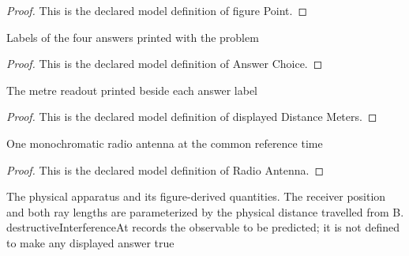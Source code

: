 \begin{proof}
  This is the declared model definition of figure Point.
\end{proof}
\begin{definition}
  \label{def:physics:phyx-mini-0117:phyxminiproblems-problemphyxmini0117-answerchoice}
  Labels of the four answers printed with the problem
\end{definition}
\begin{proof}
  This is the declared model definition of Answer Choice.
\end{proof}
\begin{definition}
  \label{def:physics:phyx-mini-0117:phyxminiproblems-problemphyxmini0117-displayeddistancemeters}
  The metre readout printed beside each answer label
\end{definition}
\begin{proof}
  This is the declared model definition of displayed Distance Meters.
\end{proof}
\begin{definition}
  \label{def:physics:phyx-mini-0117:phyxminiproblems-problemphyxmini0117-radioantenna}
  One monochromatic radio antenna at the common reference time
\end{definition}
\begin{proof}
  This is the declared model definition of Radio Antenna.
\end{proof}
\begin{definition}
  \label{def:physics:phyx-mini-0117:phyxminiproblems-problemphyxmini0117-twoantennainterferencesetup}
  The physical apparatus and its figure-derived quantities. The receiver position and both ray lengths are parameterized by the physical distance travelled from B. destructiveInterferenceAt records the observable to be predicted; it is not defined to make any displayed answer true
\end{definition}
